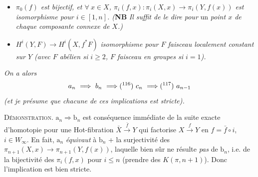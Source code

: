 \begin{itemize}
\item[$b_n$)] \textit{$\pi_0(f)$ est bijectif, et $\forall\ x \in X$, $\pi_i(f,x) : \pi_i(X,x) \longrightarrow \pi_i(Y,f(x))$ est} \textit{isomorphisme pour $i \in [1,n]$. (}\textbf{NB} \textit{Il suffit de le dire pour} \textup{un} \textit{point $x$ de chaque composante connexe de $X$.)}

\item[$c_n$)] $H^i(Y,F) \longrightarrow H^i(X,f^*F)$ \textit{isomorphisme pour $F$ faisceau localement constant sur $Y$ (avec $F$ abélien si $i \geq 2$, $F$ faisceau en groupes si $i = 1$).}
\end{itemize}

\textit{On a alors}
\[
a_n \ \Longrightarrow\ b_n \ \Longrightarrow \text{(\footnotemark[116])}\ c_n \ \Longrightarrow \text{(\footnotemark[117])}\ a_{n-1}
\]
%
%
\textit{(et je présume que chacune de ces implications est stricte).}

\textsc{Démonstration}. $\mathrm{a}_n \Longrightarrow \mathrm{b}_n$ est conséquence immédiate de la suite exacte d'homotopie pour une Hot-fibration $\bar{X} \xrightarrow{\bar{f}} Y$ qui factorise $X \xrightarrow{f} Y$ en $f = \bar{f} \circ i$, $i \in W_\infty$. En fait, $\mathrm{a}_n$ \textit{équivaut} à $\mathrm{b}_n$ + la surjectivité des $\pi_{n+1}(X,x) \longrightarrow \pi_{n+1}(Y,f(x))$, laquelle bien sûr ne résulte \textit{pas} de $\mathrm{b}_n$, i.e. de la bijectivité des $\pi_i(f,x)$ pour $i \leq n$ (prendre des $K(\pi,n+1)$). Donc l'implication est bien stricte.


